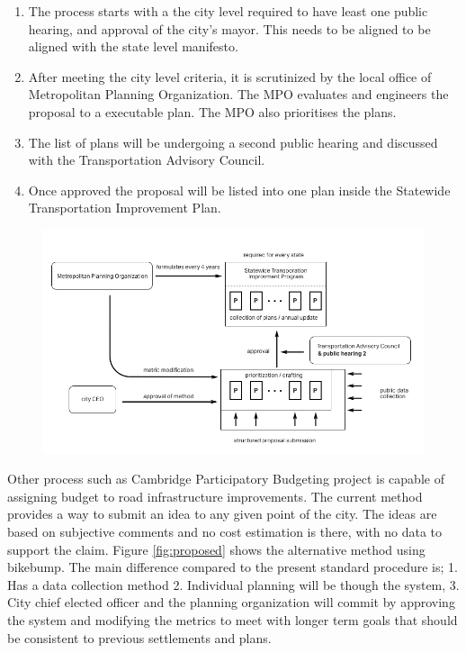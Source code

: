 \begin{enumerate}
\item The process starts with a the city level required to have least one public hearing, and approval of the city's mayor. This needs to be aligned to be aligned with the state level manifesto.
\item After meeting the city level criteria, it is scrutinized by the local office of Metropolitan Planning Organization. The MPO evaluates and engineers the proposal to a executable plan. The MPO also prioritises the plans.
\item The list of plans will be undergoing a second public hearing and discussed with the Transportation Advisory Council.
\item Once approved the proposal will be listed into one plan inside the Statewide Transportation Improvement Plan.
\end{enumerate}

\begin{figure}[!htb]
  \includegraphics[width=\textwidth]{chapters/1/fig/proposed_process.png}               
\end{figure}

Other process such as Cambridge Participatory Budgeting project is capable of assigning budget to road infrastructure improvements. The current method provides a way to submit an idea to any given point of the city. The ideas are based on subjective comments and no cost estimation is there, with no data to support the claim.
Figure \ref{fig:proposed} shows the alternative method using bikebump. The main difference compared to the present standard procedure is; 1. Has a data collection method 2. Individual planning will be though the system, 3. City chief elected officer and the planning organization will commit by approving the system and modifying the metrics to meet with longer term goals that should be consistent to previous settlements and plans.


